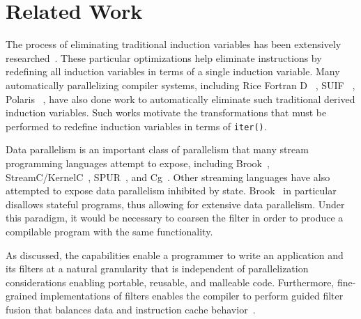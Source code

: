 \section{Related Work}
\label{sec:related}


The process of eliminating traditional induction variables has been
extensively researched~\cite{Bacon:1994,RM99:RRV}.  These particular
optimizations help eliminate instructions by redefining all induction
variables in terms of a single induction variable.  Many automatically
parallelizing compiler systems, including Rice Fortran D
~\cite{Hiranandani:1992}, SUIF ~\cite{Wilson:1994}, Polaris
~\cite{Blume:1996}, have also done work to automatically eliminate
such traditional derived induction variables.  Such works motivate 
the transformations that must be performed to redefine induction variables
in terms of {\tt iter()}.

Data parallelism is an important class of parallelism that many stream
programming languages attempt to expose, including Brook~\cite{brook04},
StreamC/KernelC~\cite{imagine03ieee}, SPUR~\cite{spur05samos}, and Cg~\cite{cg03}.
Other streaming languages
have also attempted to expose data parallelism inhibited by state.  
Brook~\cite{brook04} in particular disallows stateful
programs, thus allowing for extensive data parallelism.  Under this
paradigm, it would be necessary to coarsen the filter in order to
produce a compilable program with the same functionality.  

As discussed, the capabilities enable a programmer to write an application and its
filters at a natural granularity that is independent of
parallelization considerations enabling portable, reusable, and
malleable code.  Furthermore, fine-grained implementations of filters
enables the compiler to perform guided filter fusion that balances
data and instruction cache behavior~\cite{sermulins-lctes05}.
